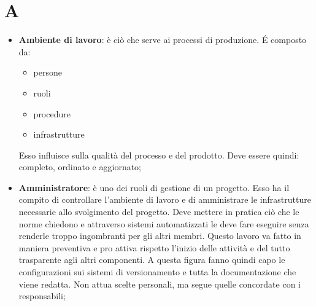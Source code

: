 % 
%
%
\section{A}

\begin{itemize}
	\item \textbf{Ambiente di lavoro}: è ciò che serve ai processi di produzione. \'E composto da:
		\begin{itemize}
			\item persone
			\item ruoli
			\item procedure
			\item infrastrutture
		\end{itemize}
	\noindent
	Esso influisce sulla qualità del processo e del prodotto. Deve essere quindi: completo, ordinato e aggiornato;

	\item \textbf{Amministratore}: è uno dei ruoli di gestione di un progetto. Esso ha il compito di controllare l'ambiente di lavoro e di amministrare le infrastrutture necessarie allo svolgimento del progetto. \newline
	Deve mettere in pratica ciò che le norme chiedono e attraverso sistemi automatizzati le deve fare eseguire senza renderle troppo ingombranti per gli altri membri. Questo lavoro va fatto in maniera preventiva e pro attiva rispetto l'inizio delle attività e del tutto trasparente agli altri componenti. \newline
	A questa figura fanno quindi capo le configurazioni sui sistemi di versionamento e tutta la documentazione che viene redatta. Non attua scelte personali, ma segue quelle concordate con i responsabili;


\end{itemize}
